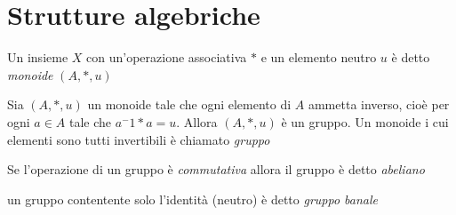         \section{Strutture algebriche}
            \begin{definition}[Monoide]\label{def:monoide}
                Un insieme $X$ con un'operazione associativa $*$ e un elemento neutro $u$ è detto \emph{monoide} $(A,*,u)$
            \end{definition}
            \begin{definition}[Gruppo]
                Sia $(A,*,u)$ un monoide tale che ogni elemento di $A$ ammetta inverso, cioè per ogni $a \in A$ tale che $a^-1*a = u$. Allora $(A,*,u)$ è un gruppo.
                Un monoide i cui elementi sono tutti invertibili è chiamato \emph{gruppo}
            \end{definition}
            \begin{definition}
                Se l'operazione di un gruppo è \emph{commutativa} allora il gruppo è detto \emph{abeliano}
            \end{definition}
            \begin{definition}
                un gruppo contentente solo l'identità (neutro) è detto \emph{gruppo banale}
            \end{definition}
